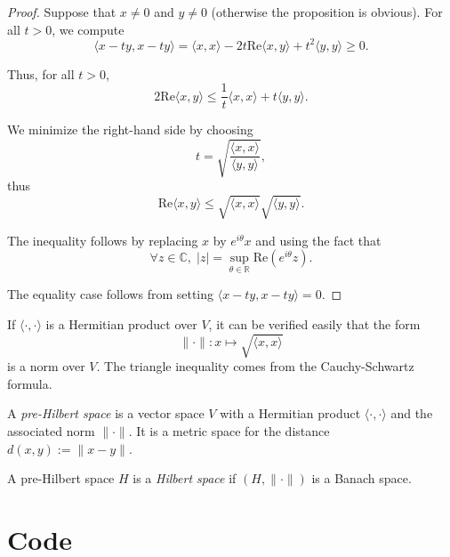 \documentclass[a4paper,11pt,openany,extrafontsizes]{memoir}
\begin{document}
\begin{proof}
  Suppose that $x \neq 0$ and $y \neq 0$ (otherwise the proposition is
  obvious). For all $t > 0$, we compute
  \[ \langle x - ty, x - ty \rangle = \langle x,x \rangle - 2t
    \mathrm{Re}\langle x,y \rangle + t^2 \langle y,y \rangle \geq
    0. \]

  Thus, for all $t > 0$,
  \[ 2 \mathrm{Re} \langle x,y \rangle \leq \frac{1}{t}\langle x,x
    \rangle + t \langle y,y \rangle. \]

  We minimize the right-hand side by choosing
  \[ t = \sqrt{\frac{\langle x,x \rangle}{\langle y,y \rangle}}, \]
  thus
  \[ \mathrm{Re} \langle x,y \rangle \leq \sqrt{\langle x,x \rangle}
    \sqrt{\langle y,y \rangle}. \]

  The inequality follows by replacing $x$ by $e^{i\theta}x$ and using the fact that
  \[ \forall z\in\mathbb{C},\; \lvert z \rvert =
    \sup_{\theta\in\mathbb{R}} \mathrm{Re}\left(e^{i\theta} z
    \right). \]

  The equality case follows from setting
  $\langle x - ty, x - ty \rangle = 0$.
\end{proof}

If $\langle\cdot,\cdot\rangle$ is a Hermitian product over $V$, it can
be verified easily that the form
\[ \lVert\cdot\rVert : x \mapsto \sqrt{\langle x,x \rangle} \] is a
norm over $V$. The triangle inequality comes from the Cauchy-Schwartz
formula. %

\begin{defn}
  A \emph{pre-Hilbert space} is a vector space $V$ with a Hermitian
  product $\langle\cdot,\cdot\rangle$ and the associated norm
  $\lVert\cdot\rVert$. It is a metric space for the distance
  $d(x,y) := \lVert x-y \rVert$.
\end{defn}

\begin{defn}
  A pre-Hilbert space $H$ is a \emph{Hilbert space} if
  $(H, \lVert\cdot\rVert)$ is a Banach space.
\end{defn}

\addtocounter{chapter}{1}




\chapter{Code}%
\label{cha:code}
\end{document}
